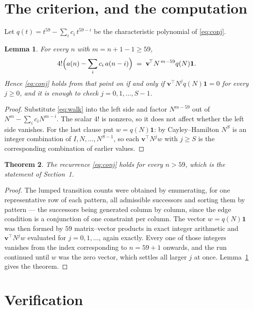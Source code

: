 \documentclass[11pt,a4paper]{article}
\theoremstyle{plain}
\newtheorem{theorem}{Theorem}
\newtheorem{lemma}[theorem]{Lemma}
\theoremstyle{definition}
\begin{document}
\section{The criterion, and the computation}

Let $q(t)=t^{59}-\sum_i c_i\,t^{59-i}$ be the characteristic polynomial of
\eqref{eq:conj}.

\begin{lemma}\label{lem:crit}
For every $n$ with $m=n+1-1\ge59$,
\[
4!\Bigl(a(n)-\sum_i c_i\,a(n-i)\Bigr)\;=\;\mathbf{v}^{\!\top}N^{\,m-59}q(N)\mathbf{1} .
\]
Hence \eqref{eq:conj} holds from that point on if and only if
$\mathbf{v}^{\!\top}N^{j}q(N)\mathbf{1}=0$ for every $j\ge0$, and it is enough to check
$j=0,1,\dots,S-1$.
\end{lemma}

\begin{proof}
Substitute \eqref{eq:walk} into the left side and factor $N^{m-59}$ out of
$N^{m}-\sum_i c_iN^{m-i}$. The scalar $4!$ is nonzero, so it does not affect whether
the left side vanishes. For the last clause put $w=q(N)\mathbf{1}$: by Cayley--Hamilton
$N^{S}$ is an integer combination of $I,N,\dots,N^{S-1}$, so each
$\mathbf{v}^{\!\top}N^{j}w$ with $j\ge S$ is the corresponding combination of earlier
values.
\end{proof}

\begin{theorem}
The recurrence \eqref{eq:conj} holds for every $n>59$, which is the statement of
Section~1.
\end{theorem}

\begin{proof}
The lumped transition counts were obtained by enumerating, for one representative row of
each pattern, all admissible successors and sorting them by pattern --- the successors being
generated column by column, since the edge condition is a conjunction of one constraint per
column. The vector $w=q(N)\mathbf{1}$ was then formed by $59$ matrix--vector products
in exact integer arithmetic and $\mathbf{v}^{\!\top}N^{j}w$ evaluated for
$j=0,1,\dots$, again exactly. Every one of those integers vanishes from the index
corresponding to $n=59+1$ onwards, and the run continued until $w$ was the zero vector,
which settles all larger $j$ at once. Lemma~\ref{lem:crit} gives the theorem.
\end{proof}

\section{Verification}
\end{document}
